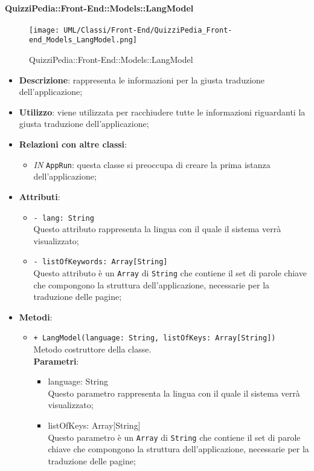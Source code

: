 \paragraph{QuizziPedia::Front-End::Models::LangModel}
		
		\label{QuizziPedia::Front-End::Models::LangModel}
		
		\begin{figure}[ht]
			\centering
			\texttt{[image: UML/Classi/Front-End/QuizziPedia\_Front-end\_Models\_LangModel.png]}
			\caption{QuizziPedia::Front-End::Models::LangModel}
		\end{figure} \FloatBarrier
		
		\begin{itemize}
			\item \textbf{Descrizione}: rappresenta le informazioni per la giusta traduzione dell'applicazione;
			\item \textbf{Utilizzo}: viene utilizzata per racchiudere tutte le informazioni riguardanti la giusta traduzione dell'applicazione;
			\item \textbf{Relazioni con altre classi}: 
			\begin{itemize}
				\item \textit{IN} \texttt{AppRun}: questa classe si preoccupa di creare la prima istanza dell'applicazione;
			\end{itemize}
			\item \textbf{Attributi}: 
			\begin{itemize}
				\item \texttt{- lang: String} \\
				Questo attributo rappresenta la lingua con il quale il sistema verrà visualizzato;  
				\item \texttt{- listOfKeywords: Array[String]} \\
				Questo attributo è un \texttt{Array} di \texttt{String} che contiene il set di parole chiave che compongono la struttura dell'applicazione, necessarie per la traduzione delle pagine; 
			\end{itemize}
			\item \textbf{Metodi}: 
			\begin{itemize}
				\item \texttt{+ LangModel(language: String, listOfKeys: Array[String])} \\
				Metodo costruttore della classe.\\
				\textbf{Parametri}:
				\begin{itemize}
					\item {language: String}\\
					Questo parametro rappresenta la lingua con il quale il sistema verrà visualizzato;
					\item {listOfKeys: Array[String]}\\
					Questo parametro è un \texttt{Array} di \texttt{String} che contiene il set di parole chiave che compongono la struttura dell'applicazione, necessarie per la traduzione delle pagine; 
				\end{itemize}
				

\end{itemize}
\end{itemize}
